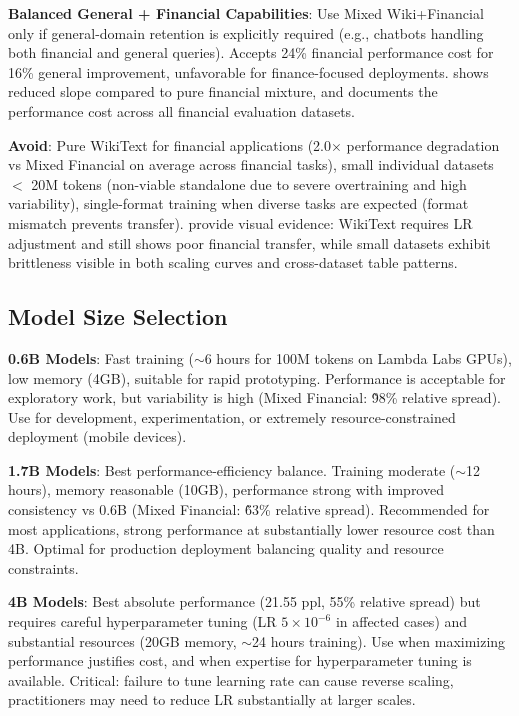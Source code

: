 \textbf{Balanced General + Financial Capabilities}: Use Mixed Wiki+Financial only if general-domain retention is explicitly required (e.g., chatbots handling both financial and general queries). Accepts 24\% financial performance cost for 16\% general improvement, unfavorable for finance-focused deployments.  shows reduced slope compared to pure financial mixture, and  documents the performance cost across all financial evaluation datasets.

\textbf{Avoid}: Pure WikiText for financial applications (2.0$\times$ performance degradation vs Mixed Financial on average across financial tasks), small individual datasets $<$ 20M tokens (non-viable standalone due to severe overtraining and high variability), single-format training when diverse tasks are expected (format mismatch prevents transfer).  provide visual evidence: WikiText requires LR adjustment and still shows poor financial transfer, while small datasets exhibit brittleness visible in both scaling curves and cross-dataset table patterns.

\subsection{Model Size Selection}

\textbf{0.6B Models}: Fast training ($\sim$6 hours for 100M tokens on Lambda Labs GPUs), low memory (4GB), suitable for rapid prototyping. Performance is acceptable for exploratory work, but variability is high (Mixed Financial: \~98\% relative spread). Use for development, experimentation, or extremely resource-constrained deployment (mobile devices).

\textbf{1.7B Models}: Best performance-efficiency balance. Training moderate ($\sim$12 hours), memory reasonable (10GB), performance strong with improved consistency vs 0.6B (Mixed Financial: \~63\% relative spread). Recommended for most applications, strong performance at substantially lower resource cost than 4B. Optimal for production deployment balancing quality and resource constraints.

\textbf{4B Models}: Best absolute performance (21.55 ppl, 55\% relative spread) but requires careful hyperparameter tuning (LR $5 \times 10^{-6}$ in affected cases) and substantial resources (20GB memory, $\sim$24 hours training). Use when maximizing performance justifies cost, and when expertise for hyperparameter tuning is available. Critical: failure to tune learning rate can cause reverse scaling, practitioners may need to reduce LR substantially at larger scales.

